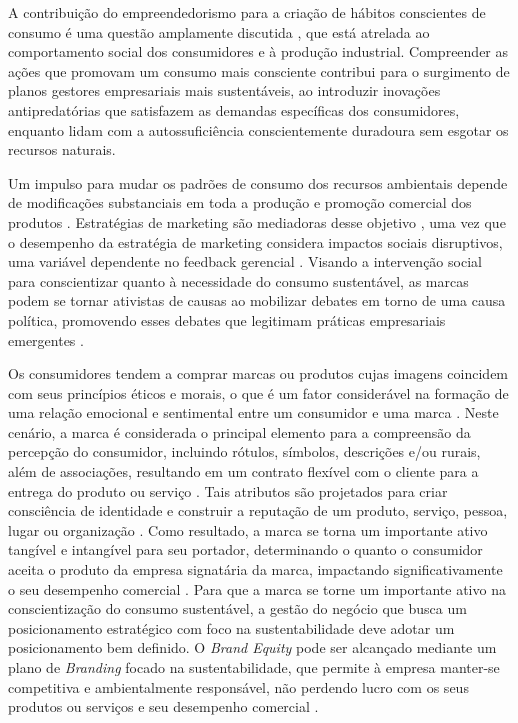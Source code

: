 A contribuição do empreendedorismo para a criação de hábitos conscientes de consumo é uma questão amplamente discutida \cite{Ramadani2016AnContext}, que está atrelada ao comportamento social dos consumidores e à produção industrial. Compreender as ações que promovam um consumo mais consciente contribui para o surgimento de planos gestores empresariais mais sustentáveis, ao introduzir inovações antipredatórias que satisfazem as demandas específicas dos consumidores, enquanto lidam com a autossuficiência conscientemente duradoura sem esgotar os recursos naturais.

Um impulso para mudar os padrões de consumo dos recursos ambientais depende de modificações substanciais em toda a produção e promoção comercial dos produtos \cite{Shen2020}. Estratégias de marketing são mediadoras desse objetivo \cite{Jin2018TheDevelopment}, uma vez que o desempenho da estratégia de marketing considera impactos sociais disruptivos, uma variável dependente no feedback gerencial \cite{Bagozzi2016StateUsage}. Visando a intervenção social para conscientizar quanto à necessidade do consumo sustentável, as marcas podem se tornar ativistas de causas ao mobilizar debates em torno de uma causa política, promovendo esses debates que legitimam práticas empresariais emergentes \cite{Koch2020BrandsCase}.

Os consumidores tendem a comprar marcas  ou produtos cujas imagens coincidem com seus princípios éticos e morais, o que é um fator considerável na formação de uma relação emocional e sentimental entre um consumidor e uma marca \cite{Liu2020b}. Neste cenário, a marca é considerada o principal elemento para a compreensão da percepção do consumidor, incluindo rótulos, símbolos, descrições e/ou rurais, além de associações, resultando em um contrato flexível com o cliente para a entrega do produto ou serviço \cite{Morgan2012ARevisited,Sanchez2016RegimenPublicidad}. Tais atributos são projetados para criar consciência de identidade e construir a reputação de um produto, serviço, pessoa, lugar ou organização \cite{Sammut-Bonnici2015BrandBranding}. Como resultado, a marca se torna um importante ativo tangível e intangível para seu portador, determinando o quanto o consumidor aceita o produto da empresa signatária da marca, impactando significativamente o seu desempenho comercial \cite{Singh2021ForestIntervention}. Para que a marca se torne um importante ativo na conscientização do consumo sustentável, a gestão do negócio que busca um posicionamento estratégico com foco na sustentabilidade deve adotar um posicionamento bem definido. O \textit{Brand Equity} pode ser alcançado mediante um plano de \textit{Branding} focado na sustentabilidade, que permite à empresa manter-se competitiva e ambientalmente responsável, não perdendo lucro com os seus produtos ou serviços e seu desempenho comercial \cite{Winzar2018BrandChain}.

